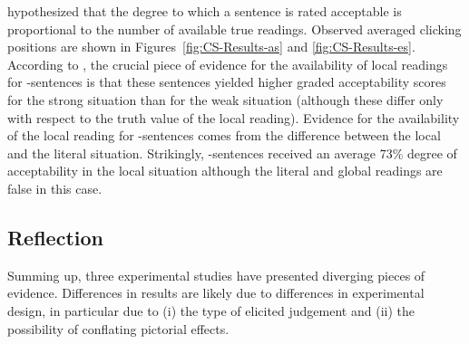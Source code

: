 \documentclass[fleqn,reqno,10pt]{article}
\newcommand{\as}{\acro{as}}
\renewcommand{\es}{\acro{es}}
\begin{document}

\citeauthor{ChemlaSpector2010:Experimental-Ev} hypothesized that the
degree to which a sentence is rated acceptable is proportional to the
number of available true readings. Observed averaged clicking
positions are shown in Figures~\ref{fig:CS-Results-as} and
\ref{fig:CS-Results-es}.
%
%
According to \citeauthor{ChemlaSpector2010:Experimental-Ev}, the
crucial piece of evidence for the availability of local readings for
\as-sentences is that these sentences yielded higher graded
acceptability scores for the strong situation than for the weak
situation (although these differ only with respect to the truth value
of the local reading). Evidence for the availability
of the local reading for \es-sentences comes from the difference
between the local and the literal situation. Strikingly, \es-sentences
received an average 73\% degree of acceptability in the local
situation although the literal and global readings are false in this
case.

\subsection{Reflection}
\label{sec:local-read-categ}

Summing up, three experimental studies have presented diverging pieces
of evidence. %
Differences in results are likely due to differences in experimental
design, in particular due to (i) the type of elicited judgement and
(ii) the possibility of conflating pictorial effects.
\end{document}
